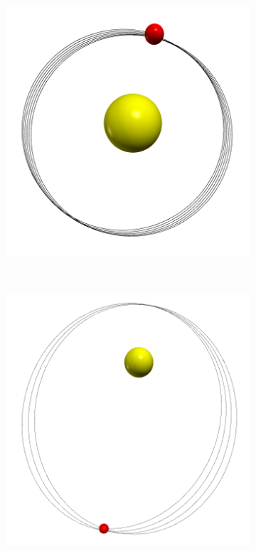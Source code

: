 \documentclass[12pt,ngerman,american]{iopart}
\begin{document}
\begin{figure}[htb]
\begin{subfigure}[c]{0.22\textwidth}
		\caption{\label{fig:MercuryOrbit-a0-small-dt-large}}
	\end{subfigure}
	~
	\begin{subfigure}[c]{0.22\textwidth}
		\includegraphics[width=\textwidth]{figs/a6T5dt20.png}
		\caption{\label{fig:MercuryOrbit-a6-small}}
	\end{subfigure}
	~
	\begin{subfigure}[c]{0.22\textwidth}
		\includegraphics[width=\textwidth]{figs/a6T10dt20.png}

\end{subfigure}
\end{figure}
\end{document}
